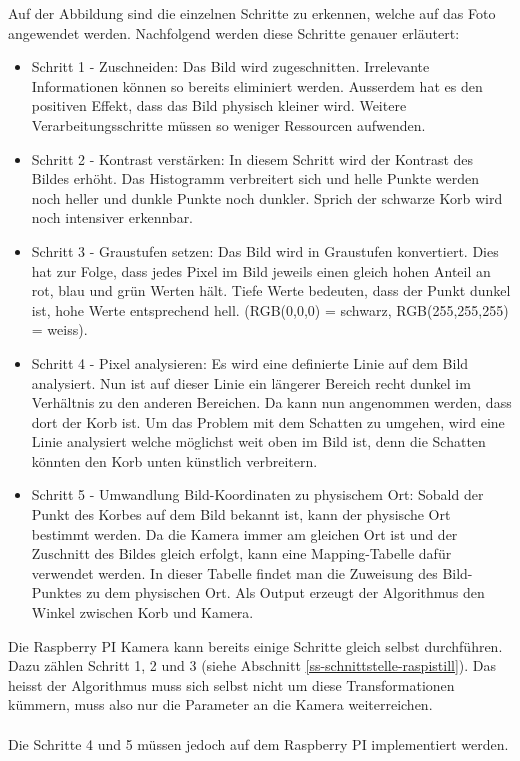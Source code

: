 Auf der Abbildung sind die einzelnen Schritte zu erkennen, welche auf das Foto angewendet werden. Nachfolgend werden diese Schritte genauer erläutert:
\begin{itemize}
	\item Schritt 1 - Zuschneiden: Das Bild wird zugeschnitten. Irrelevante Informationen können so bereits eliminiert werden. Ausserdem hat es den positiven Effekt, dass das Bild physisch kleiner wird. Weitere Verarbeitungsschritte müssen so weniger Ressourcen aufwenden. 
	
	\item Schritt 2 - Kontrast verstärken: In diesem Schritt wird der Kontrast des Bildes erhöht. Das Histogramm verbreitert sich und helle Punkte werden noch heller und dunkle Punkte noch dunkler. Sprich der schwarze Korb wird noch intensiver erkennbar. 
	
	\item Schritt 3 - Graustufen setzen: Das Bild wird in Graustufen konvertiert. Dies hat zur Folge, dass jedes Pixel im Bild jeweils einen gleich hohen Anteil an rot, blau und grün Werten hält. Tiefe Werte bedeuten, dass der Punkt dunkel ist, hohe Werte entsprechend hell. (RGB(0,0,0) = schwarz, RGB(255,255,255) = weiss).
	
	\item Schritt 4 - Pixel analysieren: Es wird eine definierte Linie auf dem Bild analysiert. Nun ist auf dieser Linie ein längerer Bereich recht dunkel im Verhältnis zu den anderen Bereichen. Da kann nun angenommen werden, dass dort der Korb ist. Um das Problem mit dem Schatten zu umgehen, wird eine Linie analysiert welche möglichst weit oben im Bild ist, denn die Schatten könnten den Korb unten künstlich verbreitern.
	
	\item Schritt 5 - Umwandlung Bild-Koordinaten zu physischem Ort: Sobald der Punkt des Korbes auf dem Bild bekannt ist, kann der physische Ort bestimmt werden. Da die Kamera immer am gleichen Ort ist und der Zuschnitt des Bildes gleich erfolgt, kann eine Mapping-Tabelle dafür verwendet werden. In dieser Tabelle findet man die Zuweisung des Bild-Punktes zu dem physischen Ort. Als Output erzeugt der Algorithmus den Winkel zwischen Korb und Kamera.
\end{itemize} 
Die Raspberry PI Kamera kann bereits einige Schritte gleich selbst durchführen. Dazu zählen Schritt 1, 2 und 3 (siehe Abschnitt \ref{ss-schnittstelle-raspistill}). Das heisst der Algorithmus muss sich selbst nicht um diese Transformationen kümmern, muss also nur die Parameter an die Kamera weiterreichen.\\
\\
Die Schritte 4 und 5 müssen jedoch auf dem Raspberry PI implementiert werden.


